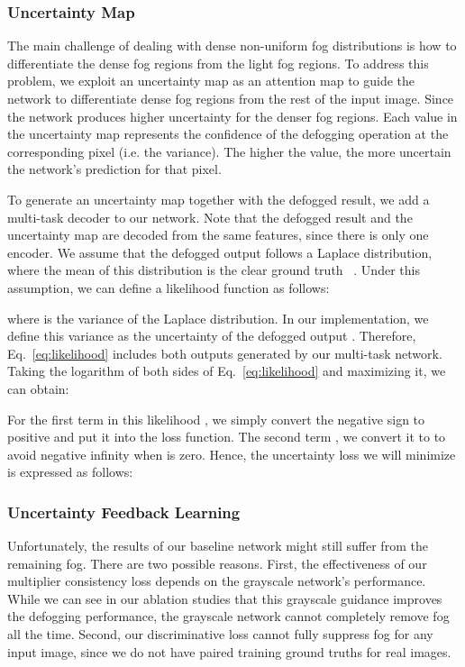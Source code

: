 \documentclass[runningheads]{llncs}
\begin{document}
\subsubsection{Uncertainty Map}
The main challenge of dealing with dense non-uniform fog distributions is how to differentiate the dense fog regions from the light fog regions.
To address this problem, we exploit an uncertainty map as an attention map to guide the network to differentiate dense fog regions from the rest of the input image. Since the network produces higher uncertainty for the denser fog regions.
Each value in the uncertainty map represents the confidence of the defogging operation at the corresponding pixel (i.e. the variance). The higher the value, the more uncertain the network's prediction for that pixel.

To generate an uncertainty map together with the defogged result, we add a multi-task decoder to our network.
Note that the defogged result and the uncertainty map are decoded from the same features, since there is only one encoder.
We assume that the defogged output  follows a Laplace distribution, where the mean of this distribution is the clear ground truth ~\cite{kendall2017uncertainties,ning2021uncertainty}.
Under this assumption, we can define a likelihood function as follows:

where  is the variance of the Laplace distribution. In our implementation, we define this variance as the uncertainty of the defogged output . Therefore, Eq.~\eqref{eq:likelihood} includes both outputs generated by our multi-task network. Taking the logarithm of both sides of Eq.~\eqref{eq:likelihood} and maximizing it, we can obtain:


For the first term in this likelihood , we simply convert the negative sign to positive and put it into the loss function. 
The second term  , we convert it to  to avoid negative infinity when  is zero.
Hence, the uncertainty loss we will minimize is expressed as follows:


\subsubsection{Uncertainty Feedback Learning}
Unfortunately, the results of our baseline network might still suffer from the remaining fog.
There are two possible reasons.
First, the effectiveness of our multiplier consistency loss depends on the grayscale network's performance. 
While we can see in our ablation studies that this grayscale guidance improves the defogging performance, the grayscale network cannot completely remove fog all the time. 
Second, our discriminative loss cannot fully suppress fog for any input image, since we do not have paired training ground truths for real images.
\end{document}
